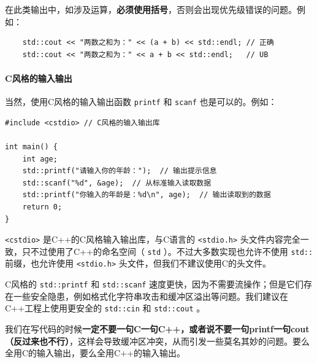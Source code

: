 在此类输出中，如涉及运算，\textbf{必须使用括号}，否则会出现优先级错误的问题。例如：
\begin{verbatim}
    std::cout << "两数之和为：" << (a + b) << std::endl; // 正确
    std::cout << "两数之和为：" << a + b << std::endl;   // UB
\end{verbatim}

\paragraph{C风格的输入输出}

当然，使用C风格的输入输出函数 \texttt{printf} 和 \texttt{scanf} 也是可以的。例如：
\begin{verbatim}
#include <cstdio> // C风格的输入输出库

int main() {
    int age;
    std::printf("请输入你的年龄：");  // 输出提示信息
    std::scanf("%d", &age);  // 从标准输入读取数据
    std::printf("你输入的年龄是：%d\n", age);  // 输出读取到的数据
    return 0;
}
\end{verbatim}

\texttt{<cstdio>} 是C++的C风格输入输出库，与C语言的 \texttt{<stdio.h>} 头文件内容完全一致，只不过使用了C++的命名空间（ \texttt{std} ）。不过大多数实现也允许不使用 \texttt{std::} 前缀，也允许使用 \texttt{<stdio.h>} 头文件，但我们不建议使用C的头文件。

C风格的 \texttt{std::printf} 和 \texttt{std::scanf} 速度更快，因为不需要流操作；但是它们存在一些安全隐患，例如格式化字符串攻击和缓冲区溢出等问题。我们建议在C++工程上使用更安全的 \texttt{std::cin} 和 \texttt{std::cout} 。

我们在写代码的时候{\color{red}\textbf{一定不要一句C一句C++，或者说不要一句printf一句cout（反过来也不行）}}，这样会导致缓冲区冲突，从而引发一些莫名其妙的问题。要么全用C的输入输出，要么全用C++的输入输出。


